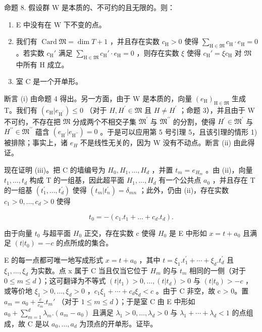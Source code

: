 命题 8. 假设群 W 是本质的、不可约的且无限的。则：

\begin{enumerate}
\def\labelenumi{(\roman{enumi})}
\item
  E 中没有在 W 下不变的点。
\item
  我们有 \(\operatorname{Card} \mathfrak{M} = \dim T + 1\) ，并且存在实数 \(c_{\mathrm{H}} > 0\) 使得 \(\sum_{\mathrm{H} \in \mathfrak{M}} c_{\mathrm{H}} \cdot e_{\mathrm{H}} = 0\) 。若实数 \(c_{\mathrm{H}}'\) 满足 \(\sum_{\mathrm{H} \in \mathfrak{M}} c_{\mathrm{H}}' \cdot e_{\mathrm{H}} = 0\) ，则存在实数 \(\xi\) 使得 \(c_{\mathrm{H}}' = \xi c_{\mathrm{H}}\) 对 \(\mathfrak{M}\) 中所有 H 成立。
\item
  室 C 是一个开单形。
\end{enumerate}

断言 (i) 由命题 4 得出。另一方面，由于 W 是本质的，向量 \((e_{\mathrm{H}})_{\mathrm{H}\in\mathfrak{M}}\) 生成 T。我们有 \((e_{\mathrm{H}}|e_{\mathrm{H}^{\prime}})\leqslant0\) （对于 \(H,H^{\prime}\in \mathfrak{M}\) 且 \(H\neq H^{\prime}\) ；命题 3），并且由于 W 不可约，不存在把 \(\mathfrak{M}\) 分成两个不相交子集 \(\mathfrak{M}^{\prime}\) 与 \(\mathfrak{M}^{\prime\prime}\) 的分割，使得 \(H^{\prime}\in \mathfrak{M}^{\prime}\) 与 \(H^{\prime\prime}\in \mathfrak{M}^{\prime\prime}\) 蕴含 \((e_{\mathrm{H}^{\prime}}|e_{\mathrm{H}^{\prime\prime}})=0\) 。于是可以应用第 5 号引理 5，且该引理的情形 1) 被排除；事实上，诸 \(e_{H}\) 不是线性无关的，因为 W 没有不动点。断言 (ii) 由此得证。

现在证明 (iii)。把 C 的墙编号为 \(H_{0}, H_{1}, \ldots, H_{d}\) ，并置 \(t_{m} = e_{H_{m}}\) 。由 (ii)，向量 \(t_{1}, \ldots, t_{d}\) 构成 T 的一组基，因此超平面 \(H_{1}, \ldots, H_{d}\) 有一个公共点 \(a_{0}\) ，并且存在 T 的一组基 \((t_{1}^{\prime}, \ldots, t_{d}^{\prime})\) 使得 \((t_{m}|t_{n}^{\prime}) = \delta_{mn}\) ；此外，仍由 (ii)，存在实数 \(c_{1} > 0, \ldots, c_{d} > 0\) 使得

\[
t _ {0} = - \left(c _ {1}. t _ {1} + \dots + c _ {d}. t _ {d}\right).
\]

由于向量 \(t_{0}\) 与超平面 \(H_{0}\) 正交，存在实数 c 使得 \(H_{0}\) 是 E 中形如 \(x = t + a_{0}\) 且满足 \((t|t_{0}) = -c\) 的点所成的集合。

E 的每一点都可唯一地写成形式 \(x = t + a_{0}\) ，其中 \(t = \xi_{1}.t_{1}^{\prime} + \cdots + \xi_{d}.t_{d}^{\prime}\) 且 \(\xi_{1}, \ldots, \xi_{d}\) 为实数。点 x 属于 C 当且仅当它位于 \(H_{m}\) 的与 \(t_{m}\) 相同的一侧（对于 \(0 \leqslant m \leqslant d\) ）；这可翻译为不等式 \((t|t_{1}) > 0, \ldots, (t|t_{d}) > 0\) 与 \((t|t_{0}) > -c\) ，或等价地 \(\xi_{1} > 0, \ldots, \xi_{d} > 0\) ，\(c_{1}\xi_{1} + \cdots + c_{d}\xi_{d} < c\) 。由于 C 非空，故 c \textgreater{} 0。置 \(a_{m} = a_{0} + \frac{c}{c_{m}}.t_{m}'\) （对于 \(1 \leqslant m \leqslant d\) ）；于是室 C 由 E 中形如 \(a_{0} + \sum_{m=1}^{d} \lambda_{m}.(a_{m} - a_{0})\) 且满足 \(\lambda_{1} > 0, \ldots, \lambda_{d} > 0\) 与 \(\lambda_{1} + \cdots + \lambda_{d} < 1\) 的点组成，故 C 是以 \(a_{0}, \ldots, a_{d}\) 为顶点的开单形。证毕。

